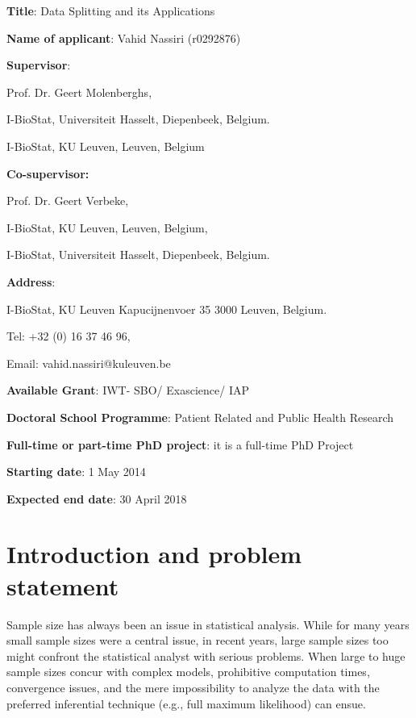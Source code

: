 \documentclass[14pt]{article}
\begin{document}
{\large{

\textbf{Title}: {\Large{Data Splitting and its Applications}}
\vspace*{0.5cm}

\textbf{Name of applicant}: {\Large{Vahid Nassiri}} (r0292876)
\vspace*{0.5cm}

\textbf{Supervisor}:

{\Large{Prof. Dr. Geert Molenberghs,}} 

I-BioStat, Universiteit Hasselt, Diepenbeek, Belgium.

I-BioStat, KU Leuven, Leuven, Belgium

\vspace*{0.5cm}

\textbf{Co-supervisor:}

{\Large{Prof. Dr. Geert Verbeke,}}

I-BioStat, KU Leuven, Leuven, Belgium,

I-BioStat, Universiteit Hasselt, Diepenbeek, Belgium.

\vspace*{0.5cm}
\textbf{Address}: 

I-BioStat, KU Leuven
Kapucijnenvoer 35 3000 Leuven, Belgium. 

Tel: +32 (0) 16 37 46 96, 

Email: vahid.nassiri@kuleuven.be

\vspace*{0.5cm}
\textbf{Available Grant}: IWT- SBO/ Exascience/ IAP 

\vspace*{0.5cm}
\textbf{Doctoral School Programme}: Patient Related and Public Health Research
\vspace*{0.5cm}

\textbf{Full-time or part-time PhD project}: it is a full-time PhD Project 

\vspace*{0.5cm}
\textbf{Starting date}: 1 May 2014 

\vspace*{0.5cm}
\textbf{Expected end date}: 30 April 2018}}




\newpage


\section{Introduction and problem statement}
\label{sec_intro}
Sample size has always been an issue in statistical analysis. While for many years small sample sizes were a central issue, in recent years, large sample sizes too might confront the statistical analyst with serious problems. When large to huge sample sizes concur with complex models, prohibitive computation times, convergence issues, and the mere impossibility to analyze the data with the preferred inferential technique (e.g., full maximum likelihood) can ensue. 
\end{document}
